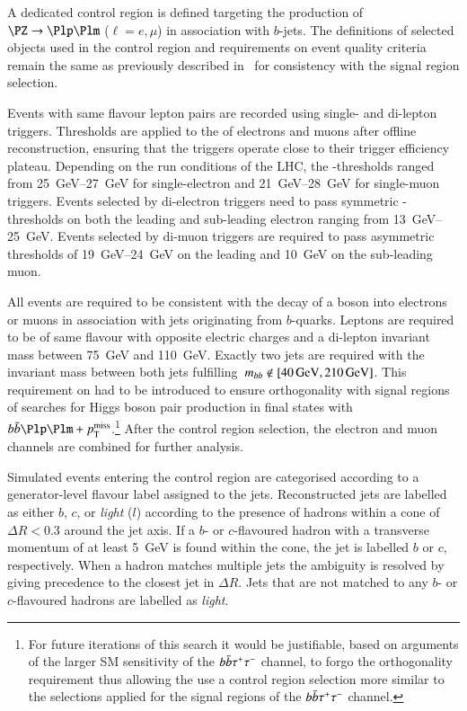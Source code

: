 A dedicated control region is defined targeting the production of
$\PZ \ra \Plp\Plm$ ($\ell = e , \mu$) in association with
$b$-jets. The definitions of selected objects used in the control
region and requirements on event quality criteria remain the same as
previously described
in~ for
consistency with the signal region selection.

Events with same flavour lepton pairs are recorded using single- and
di-lepton triggers. Thresholds are applied to the \pT of electrons and
muons after offline reconstruction, ensuring that the triggers operate
close to their trigger efficiency plateau. Depending on the run
conditions of the LHC, the \pT-thresholds ranged from
\SIrange{25}{27}{\GeV} for single-electron and \SIrange{21}{28}{\GeV}
for single-muon triggers. Events selected by di-electron triggers need
to pass symmetric \pT-thresholds on both the leading and sub-leading
electron ranging from \SIrange{13}{25}{\GeV}. Events selected by
di-muon triggers are required to pass asymmetric thresholds of
\SIrange{19}{24}{\GeV} on the leading and \SI{10}{\GeV} on the
sub-leading muon.

All events are required to be consistent with the decay of a \PZ boson
into electrons or muons in association with jets originating from
$b$-quarks. Leptons are required to be of same flavour with opposite
electric charges and a di-lepton invariant mass between \SI{75}{\GeV}
and \SI{110}{\GeV}. Exactly two \btagged jets are required with the
invariant mass between both jets
fulfilling~$\mBB \not\in [\SI{40}{\GeV}, \SI{210}{\GeV}]$. This
requirement on \mBB had to be introduced to ensure orthogonality with
signal regions of searches for Higgs boson pair production in final
states with $\bbbar\Plp\Plm + \pTmissAbs$.\footnote{For future
  iterations of this search it would be justifiable, based on
  arguments of the larger SM \HH sensitivity of the
  $b\bar{b}\tau^{+}\tau^{-}$ channel, to forgo the orthogonality
  requirement thus allowing the use a \ZHF control region selection
  more similar to the selections applied for the signal regions of the
  $b\bar{b}\tau^{+}\tau^{-}$ channel.} After the \ZHF control region
selection, the electron and muon channels are combined for further
analysis.

Simulated \Zjets events entering the \ZHF control region are
categorised according to a generator-level flavour label assigned to
the \btagged jets. Reconstructed jets are labelled as either $b$, $c$,
or \emph{light} ($l$) according to the presence of hadrons within a
cone of $\Delta R < 0.3$ around the jet axis. If a $b$- or
$c$-flavoured hadron with a transverse momentum of at least
\SI{5}{\GeV} is found within the cone, the jet is labelled $b$ or $c$,
respectively. When a hadron matches multiple jets the ambiguity is
resolved by giving precedence to the closest jet in $\Delta R$. Jets
that are not matched to any $b$- or $c$-flavoured hadrons are labelled
as \emph{light}.

